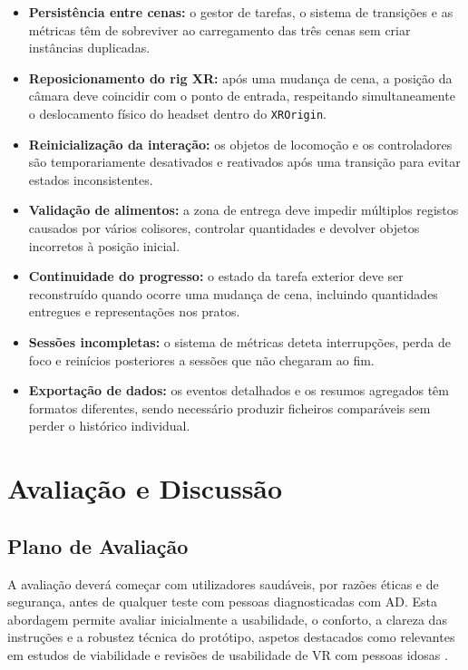 \documentclass[12pt,a4paper,oneside]{report}
\newcommand{\blankpage}{
    \clearpage
    \thispagestyle{empty}
    \null
    \clearpage
}
\begin{document}
\begin{itemize}
    \item \textbf{Persistência entre cenas:} o gestor de tarefas, o sistema de transições e as métricas têm de sobreviver ao carregamento das três cenas sem criar instâncias duplicadas.
    \item \textbf{Reposicionamento do rig XR:} após uma mudança de cena, a posição da câmara deve coincidir com o ponto de entrada, respeitando simultaneamente o deslocamento físico do headset dentro do \texttt{XROrigin}.
    \item \textbf{Reinicialização da interação:} os objetos de locomoção e os controladores são temporariamente desativados e reativados após uma transição para evitar estados inconsistentes.
    \item \textbf{Validação de alimentos:} a zona de entrega deve impedir múltiplos registos causados por vários colisores, controlar quantidades e devolver objetos incorretos à posição inicial.
    \item \textbf{Continuidade do progresso:} o estado da tarefa exterior deve ser reconstruído quando ocorre uma mudança de cena, incluindo quantidades entregues e representações nos pratos.
    \item \textbf{Sessões incompletas:} o sistema de métricas deteta interrupções, perda de foco e reinícios posteriores a sessões que não chegaram ao fim.
    \item \textbf{Exportação de dados:} os eventos detalhados e os resumos agregados têm formatos diferentes, sendo necessário produzir ficheiros comparáveis sem perder o histórico individual.
\end{itemize}

\blankpage

\chapter{Avaliação e Discussão}

\section{Plano de Avaliação}

A avaliação deverá começar com utilizadores saudáveis, por razões éticas e de segurança, antes de qualquer teste com pessoas diagnosticadas com \ac{AD}. Esta abordagem permite avaliar inicialmente a usabilidade, o conforto, a clareza das instruções e a robustez técnica do protótipo, aspetos destacados como relevantes em estudos de viabilidade e revisões de usabilidade de \ac{VR} com pessoas idosas \cite{yun2020,tuena2020}.
\end{document}
